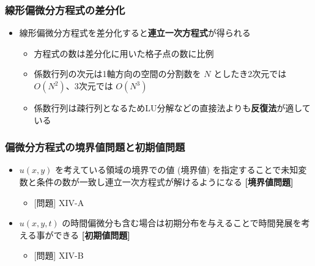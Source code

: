 \documentclass[dvipdfmx,aspectratio=169,20pt]{beamer}
\newcommand{\myfontsetting}[3]{{\fontsize{#1}{#2}\selectfont #3}}
\begin{document}
\begin{frame}
\frametitle{\myfontsetting{28pt}{28pt}{線形偏微分方程式の差分化}}

\begin{itemize}
    \setlength{\itemsep}{0.2cm}
	\item \myfontsetting{18pt}{18pt}{線形偏微分方程式を差分化すると{\bf 連立一次方程式}が得られる}
	\begin{itemize}
	    \setlength{\itemsep}{0.2cm}
	    \item \myfontsetting{15pt}{15pt}{方程式の数は差分化に用いた格子点の数に比例}
	    \item \myfontsetting{15pt}{15pt}{係数行列の次元は1軸方向の空間の分割数を $N$ としたき2次元では $O(N^2)$、3次元では $O(N^3)$}
	    \item \myfontsetting{15pt}{15pt}{係数行列は疎行列となるためLU分解などの直接法よりも{\bf 反復法}が適している}
	\end{itemize}
\end{itemize}

\end{frame}
\begin{frame}
\frametitle{\myfontsetting{23pt}{23pt}{偏微分方程式の境界値問題と初期値問題}}

\begin{itemize}
    \setlength{\itemsep}{0.2cm}
	\item \myfontsetting{15pt}{15pt}{$u(x,y)$ を考えている領域の境界での値 (境界値) を指定することで未知変数と条件の数が一致し連立一次方程式が解けるようになる \myfontsetting{12pt}{12pt}{\bf [境界値問題]}}
	\begin{itemize}
		\item \myfontsetting{12pt}{12pt}{\color{myblue1}[問題] X\hspace{-.1em}I\hspace{-.1em}V-A}
	\end{itemize}
	\item \myfontsetting{15pt}{15pt}{$u(x,y,t)$ の時間偏微分も含む場合は初期分布を与えることで時間発展を考える事ができる \myfontsetting{12pt}{12pt}{\bf [初期値問題]}}
	\begin{itemize}
		\item \myfontsetting{12pt}{12pt}{\color{myblue1}[問題] X\hspace{-.1em}I\hspace{-.1em}V-B}
	\end{itemize}
\end{itemize}

\end{frame}
\end{document}
